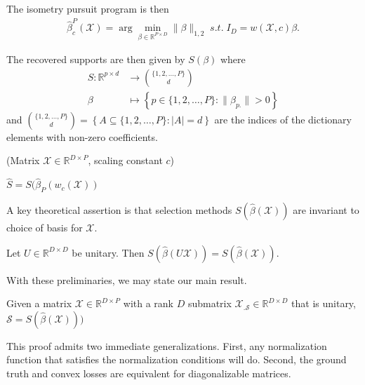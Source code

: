 The isometry pursuit program is then
\begin{align}
\label{prog:isometry_pursuit}
\widehat \beta^{P}_c (\mathcal X)  = \arg \min_{\beta \in \mathbb R^{P \times D}} \| \beta \|_{1,2} \; s.t. \; I_D = w ({ \mathcal X}, c) \beta.
\end{align}

The recovered supports are then given by $S(\beta)$ where 
\begin{align}
S: \mathbb{R}^{p \times d} &\to \binom{\{1, 2, \ldots, P\}}{d} \\
\beta &\mapsto \left\{ p \in \{1, 2, \ldots, P\} :  \|\beta_{p.}\| > 0 \right\}
\end{align}
and $\binom{\{1, 2, \ldots, P\}}{d} = \left\{ A \subseteq \{1, 2, \ldots, P\} : \left|A\right| = d \right\}$ are the indices of the dictionary elements with non-zero coefficients.

\begin{algorithm}[H]
\caption{\isometrypursuit(Matrix $\mathcal X \in \mathbb R^{D\times P}$, scaling constant $c$)}
\begin{algorithmic}[1]
 $\widehat S= S (\widehat \beta_P(w_c(\mathcal X))$ 
\end{algorithmic}
\end{algorithm}


A key theoretical assertion is that selection methods $S(\widehat {\beta} (\mathcal X))$ are invariant to choice of basis for $\mathcal X$.

\begin{proposition}
\label{prop:basis_pursuit_selection_equivalence}
Let $U \in \mathbb R^{D \times D}$ be unitary.
 Then $S(\widehat \beta  (U \mathcal X)) = S(\widehat \beta (\mathcal X))$.
\end{proposition}

With these preliminaries, we may state our main result.

\begin{proposition}
\label{prop:unitary_selection}
Given a matrix $\mathcal X \in \mathbb R^{D \times P}$ with a rank $D$ submatrix $\mathcal X_{.\mathcal S} \in \mathbb R^{D \times D}$ that is unitary, $\mathcal S = S(\widehat{\beta} (\mathcal X)))$
 \end{proposition}
 
 This proof admits two immediate generalizations.
First, any normalization function that satisfies the normalization conditions will do.
Second, the ground truth and convex losses are equivalent for diagonalizable matrices.


